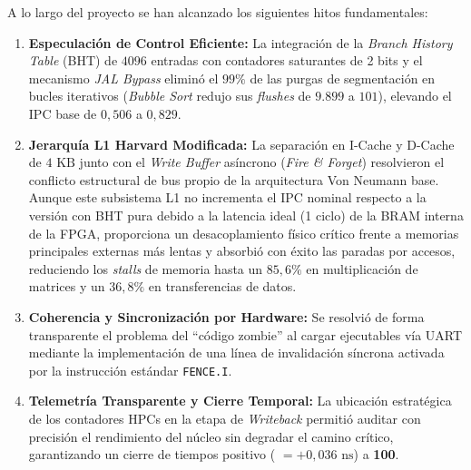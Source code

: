 \documentclass[10pt,a4paper]{article}
\begin{document}
A lo largo del proyecto se han alcanzado los siguientes hitos fundamentales:
\begin{enumerate}
    \item \textbf{Especulación de Control Eficiente:} La integración de la \textit{Branch History Table} (BHT) de $4096$ entradas con contadores saturantes de
    2 bits y el mecanismo \textit{JAL Bypass} eliminó el $99\%$ de las purgas de segmentación en bucles iterativos (\textit{Bubble Sort} redujo sus
    \textit{flushes} de $9.899$ a $101$), elevando el IPC base de $0,506$ a $0,829$.
    \item \textbf{Jerarquía L1 Harvard Modificada:} La separación en I-Cache y D-Cache de $4\text{ KB}$ junto con el \textit{Write Buffer} asíncrono 
    (\textit{Fire \& Forget}) resolvieron el conflicto estructural de bus propio de la arquitectura Von Neumann base. Aunque este subsistema L1 no incrementa el 
    IPC nominal respecto a la versión con BHT pura debido a la latencia ideal (1 ciclo) de la BRAM interna de la FPGA, proporciona un desacoplamiento físico crítico 
    frente a memorias principales externas más lentas y absorbió con éxito las paradas por accesos, reduciendo los \textit{stalls} de memoria hasta un $85,6\%$ en 
    multiplicación de matrices y un $36,8\%$ en transferencias de datos.
    \item \textbf{Coherencia y Sincronización por Hardware:} Se resolvió de forma transparente el problema del ``código zombie'' al cargar ejecutables vía UART
    mediante la implementación de una línea de invalidación síncrona activada por la instrucción estándar \texttt{FENCE.I}.
    \item \textbf{Telemetría Transparente y Cierre Temporal:} La ubicación estratégica de los contadores HPCs en la etapa de \textit{Writeback} permitió auditar
    con precisión el rendimiento del núcleo sin degradar el camino crítico, garantizando un cierre de tiempos positivo ( $= +0,036\text{ ns}$) a
    \textbf{100}.
\end{enumerate}
\end{document}
